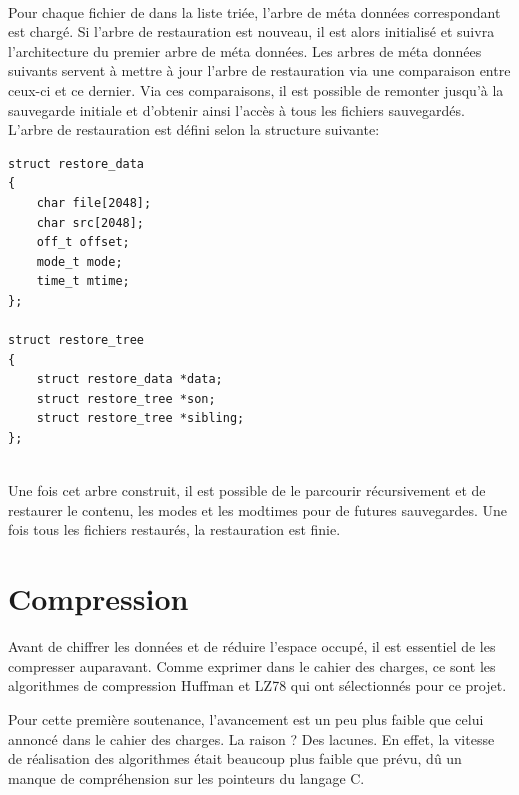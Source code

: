             \paragraph*{}
            Pour chaque fichier de dans la liste triée, l'arbre de méta données correspondant est chargé. Si l'arbre de restauration est nouveau, il est alors initialisé et suivra l'architecture du premier arbre de méta données. Les arbres de méta données suivants servent à mettre à jour l'arbre de restauration via une comparaison entre ceux-ci et ce dernier. Via ces comparaisons, il est possible de remonter jusqu'à la sauvegarde initiale et d'obtenir ainsi l'accès à tous les fichiers sauvegardés.
            L'arbre de restauration est défini selon la structure suivante:\\
            \newpage
            \begin{lstlisting}[style=CStyle]
struct restore_data
{
    char file[2048];
    char src[2048];
    off_t offset;
    mode_t mode;
    time_t mtime;
};

struct restore_tree
{
    struct restore_data *data;
    struct restore_tree *son;
    struct restore_tree *sibling;
};
            \end{lstlisting}\\
            Une fois cet arbre construit, il est possible de le parcourir récursivement et de restaurer le contenu, les modes et les modtimes pour de futures sauvegardes. Une fois tous les fichiers restaurés, la restauration est finie.
\newpage

\section{Compression}
    Avant de chiffrer les données et de réduire l'espace occupé, il est essentiel de les compresser auparavant. Comme exprimer dans le cahier des charges, ce sont les algorithmes de compression Huffman et LZ78 qui ont sélectionnés pour ce projet.
    
    Pour cette première soutenance, l'avancement est un peu plus faible que celui annoncé dans le cahier des charges. La raison ? Des lacunes. En effet, la vitesse de réalisation des algorithmes était beaucoup plus faible que prévu, dû un manque de compréhension sur les pointeurs du langage C.
    
